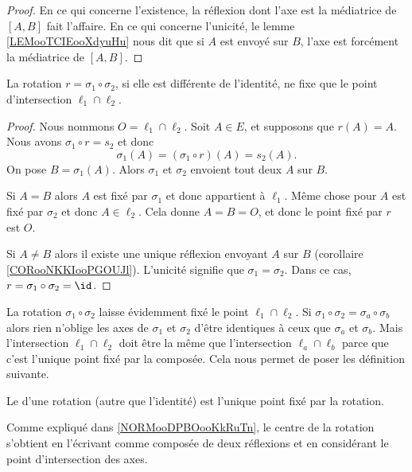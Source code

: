 \begin{proof}
    En ce qui concerne l'existence, la réflexion dont l'axe est la médiatrice de \( [A,B]\) fait l'affaire. En ce qui concerne l'unicité, le lemme \ref{LEMooTCIEooXdyuHu} nous dit que si \( A\) est envoyé sur \( B\), l'axe est forcément la médiatrice de \( [A,B]\).
\end{proof}

\begin{lemma}        \label{LEMooIJELooLWqBfE}
    La rotation \( r=\sigma_1\circ\sigma_2\), si elle est différente de l'identité, ne fixe que le point d'intersection \( \ell_1\cap\ell_2\).
\end{lemma}

\begin{proof}
    Nous nommons \( O=\ell_1\cap\ell_2\). Soit \( A\in E\), et supposons que \( r(A)=A\). Nous avons \( \sigma_1\circ r=s_2\) et donc
    \begin{equation}
        \sigma_1(A)=(\sigma_1\circ r)(A)=s_2(A).
    \end{equation}
    On pose \( B=\sigma_1(A)\). Alors \( \sigma_1\) et \( \sigma_2\) envoient tout deux \( A\) sur \( B\). 
    
    Si \( A=B\) alors \( A\) est fixé par \( \sigma_1\) et donc appartient à \( \ell_1\). Même chose pour \( A\) est fixé par \( \sigma_2\) et donc \( A\in\ell_2\). Cela donne \( A=B=O\), et donc le point fixé par \( r\) est \( O\).

    Si \( A\neq B\) alors il existe une unique réflexion envoyant \( A\) sur \( B\) (corollaire \ref{CORooNKKIooPGOUJl}). L'unicité signifie que \( \sigma_1=\sigma_2\). Dans ce cas, \( r=\sigma_1\circ\sigma_2=\id\).
\end{proof}

\begin{normaltext}      \label{NORMooDPBOooKkRuTn}
    La rotation \( \sigma_1\circ\sigma_2\) laisse évidemment fixé le point \( \ell_1\cap \ell_2\). Si \( \sigma_1\circ\sigma_2=\sigma_a\circ\sigma_b\) alors rien n'oblige les axes de \( \sigma_1\) et \( \sigma_2\) d'être identiques à ceux que \( \sigma_a\) et \( \sigma_b\). Mais l'intersection \( \ell_1\cap\ell_2\) doit être la même que l'intersection \( \ell_a\cap \ell_b\) parce que c'est l'unique point fixé par la composée. Cela nous permet de poser les définition suivante.
\end{normaltext}

\begin{definition}
    Le  d'une rotation (autre que l'identité) est l'unique point fixé par la rotation.
\end{definition}
Comme expliqué dans \ref{NORMooDPBOooKkRuTn}, le centre de la rotation s'obtient en l'écrivant comme composée de deux réflexions et en considérant le point d'intersection des axes.


